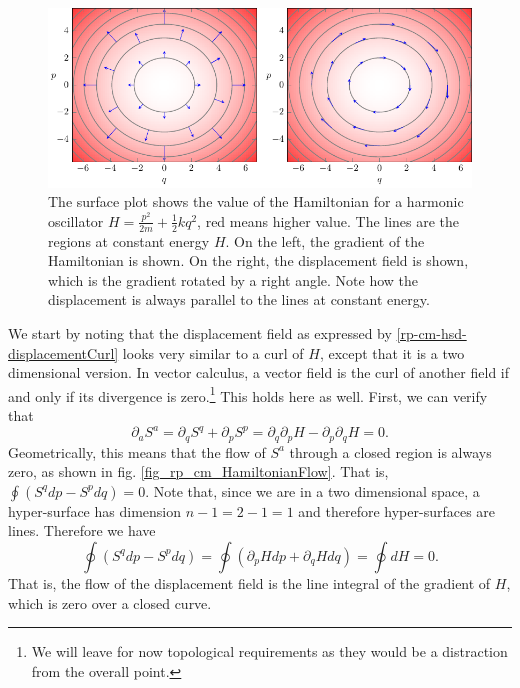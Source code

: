 \begin{figure}
	\centering
		\includegraphics{images/fig_rp_cm_HamiltonianRotation.pdf}
	\caption {The surface plot shows the value of the Hamiltonian for a harmonic oscillator $H=\frac{p^2}{2m} + \frac{1}{2} k q^2$, red means higher value. The lines are the regions at constant energy $H$. On the left, the gradient of the Hamiltonian is shown. On the right, the displacement field is shown, which is the gradient rotated by a right angle. Note how the displacement is always parallel to the lines at constant energy.} \label{fig_rp_cm_HamiltonianRotation}
\end{figure}


We start by noting that the displacement field as expressed by \ref{rp-cm-hsd-displacementCurl} looks very similar to a curl of $H$, except that it is a two dimensional version. In vector calculus, a vector field is the curl of another field if and only if its divergence is zero.\footnote{We will leave for now topological requirements as they would be a distraction from the overall point.} This holds here as well. First, we can verify that
\begin{equation}
	\partial_a S^a = \partial_q S^q + \partial_p S^p = \partial_q \partial_p H - \partial_p \partial_q H = 0.
\end{equation}
Geometrically, this means that the flow of $S^a$ through a closed region is always zero, as shown in fig. \ref{fig_rp_cm_HamiltonianFlow}. That is, $\oint \left( S^q dp - S^p dq \right) = 0$. Note that, since we are in a two dimensional space, a hyper-surface has dimension $n-1 = 2-1 = 1$ and therefore hyper-surfaces are lines. Therefore we have 
\begin{equation}
	\oint \left( S^q dp - S^p dq \right) = \oint \left( \partial_p H dp + \partial_q H dq \right) = \oint dH = 0.
\end{equation}
That is, the flow of the displacement field is the line integral of the gradient of $H$, which is zero over a closed curve.

